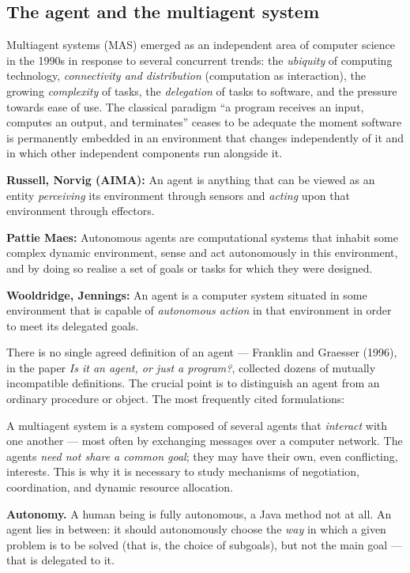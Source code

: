 \documentclass[11pt,a4paper]{article}
\theoremstyle{definition}
\providecommand{\uv}[1]{``#1''}
\begin{document}
\subsection{The agent and the multiagent system}
Multiagent systems (MAS) emerged as an independent area of computer science in the 1990s in
response to several concurrent trends: the \emph{ubiquity} of computing technology,
\emph{connectivity and distribution} (computation as interaction), the growing \emph{complexity}
of tasks, the \emph{delegation} of tasks to software, and the pressure towards ease of use. The
classical paradigm \uv{a program receives an input, computes an output, and terminates} ceases to
be adequate the moment software is permanently embedded in an environment that changes
independently of it and in which other independent components run alongside it.
\begin{defbox}
\textbf{Russell, Norvig (AIMA):} An agent is anything that can be viewed as an entity
\emph{perceiving} its environment through sensors and \emph{acting} upon that environment through
effectors.

\textbf{Pattie Maes:} Autonomous agents are computational systems that inhabit some complex
dynamic environment, sense and act autonomously in this environment, and by doing so realise a
set of goals or tasks for which they were designed.

\textbf{Wooldridge, Jennings:} An agent is a computer system situated in some environment that is
capable of \emph{autonomous action} in that environment in order to meet its delegated goals.
\end{defbox}
There is no single agreed definition of an agent --- Franklin and Graesser (1996), in the paper
\emph{Is it an agent, or just a program?}, collected dozens of mutually incompatible definitions.
The crucial point is to distinguish an agent from an ordinary procedure or object. The most
frequently cited formulations:
\begin{defbox}
A multiagent system is a system composed of several agents that \emph{interact} with one another
--- most often by exchanging messages over a computer network. The agents \emph{need not share a
common goal}; they may have their own, even conflicting, interests. This is why it is necessary
to study mechanisms of negotiation, coordination, and dynamic resource allocation.
\end{defbox}

\textbf{Autonomy.} A human being is fully autonomous, a Java method not at all. An agent lies in
between: it should autonomously choose the \emph{way} in which a given problem is to be solved
(that is, the choice of subgoals), but not the main goal --- that is delegated to it.
\end{document}

